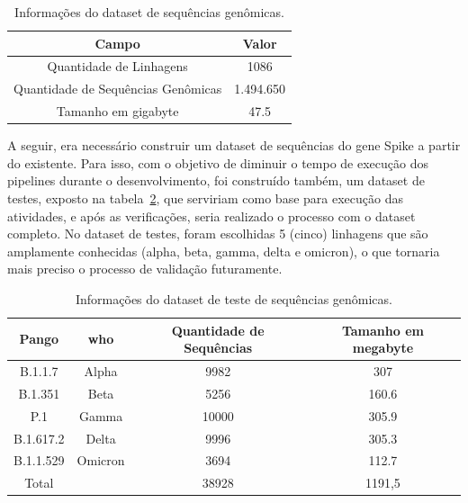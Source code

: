 \begin{table}[htb]
  \caption{Informações do dataset de sequências genômicas.}
  \begin{center}
    \begin{tabular}{c|c}
      \hline
      Campo                              & Valor     \\
      \hline
      Quantidade de Linhagens            & 1086      \\
      Quantidade de Sequências Genômicas & 1.494.650 \\
      Tamanho em \gls{gigabyte}          & 47.5      \\
      \hline
    \end{tabular}
  \end{center}
  \label{tab:datasetGenomas}
\end{table}

A seguir, era necessário construir um dataset de sequências do gene Spike a partir do existente. Para isso, com o objetivo de diminuir o tempo de execução dos pipelines durante o desenvolvimento, foi construído também, um dataset de testes, exposto na tabela~\ref{tab:datasetGenomasTeste}, que serviriam como base para execução das atividades, e após as verificações, seria realizado o processo com o dataset completo. No dataset de testes, foram escolhidas 5 (cinco) linhagens que são amplamente conhecidas (alpha, beta, gamma, delta e omicron), o que tornaria mais preciso o processo de validação futuramente.

\begin{table}[htb]
  \caption{Informações do dataset de teste de sequências genômicas.}
  \begin{center}
    \begin{tabular}{c|c|c|c}
      \hline
      Pango     & \gls{who} & Quantidade de Sequências & Tamanho em \gls{megabyte} \\
      \hline
      B.1.1.7   & Alpha     & 9982                     & 307                       \\
      B.1.351   & Beta      & 5256                     & 160.6                     \\
      P.1       & Gamma     & 10000                    & 305.9                     \\
      B.1.617.2 & Delta     & 9996                     & 305.3                     \\
      B.1.1.529 & Omicron   & 3694                     & 112.7                     \\
      \hline
      Total     &           & 38928                    & 1191,5                    \\
      \hline
    \end{tabular}
  \end{center}
  \label{tab:datasetGenomasTeste}
\end{table}

